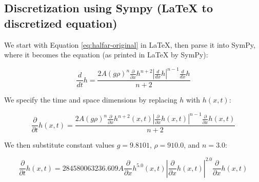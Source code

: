\documentclass{article}
\begin{document}
\subsection{Discretization using Sympy (LaTeX to discretized
    equation)}\label{sec:latex_to_discrete}

We start with Equation \ref{eq:halfar-original} in LaTeX, then parse it into
SymPy, where it becomes the equation (as printed in LaTeX by SymPy):


\begin{equation}
    \frac{d}{d t} h = \frac{2 A \left(g \rho\right)^{n} \frac{\partial}{\partial x} h^{n + 2} \left|{\frac{d}{d x} h}\right|^{n - 1} \frac{d}{d x} h}{n + 2}
\end{equation}



We specify the time and space dimensions by replacing $h$ with $h(x,t)$:

\begin{equation}
    \frac{\partial}{\partial t} h{\left(x,t \right)} = \frac{2 A \left(g \rho\right)^{n} \frac{\partial}{\partial x} h^{n + 2}{\left(x,t \right)} \left|{\frac{\partial}{\partial x} h{\left(x,t \right)}}\right|^{n - 1} \frac{\partial}{\partial x} h{\left(x,t \right)}}{n + 2}
\end{equation}



We then substitute constant values $g=9.8101$, $\rho=910.0$, and $n=3.0$:

\begin{equation}
    \frac{\partial}{\partial t} h{\left(x,t \right)} = 284580063236.609 A \frac{\partial}{\partial x} h^{5.0}{\left(x,t \right)} \left|{\frac{\partial}{\partial x} h{\left(x,t \right)}}\right|^{2.0} \frac{\partial}{\partial x} h{\left(x,t \right)}
\end{equation}
\end{document}
